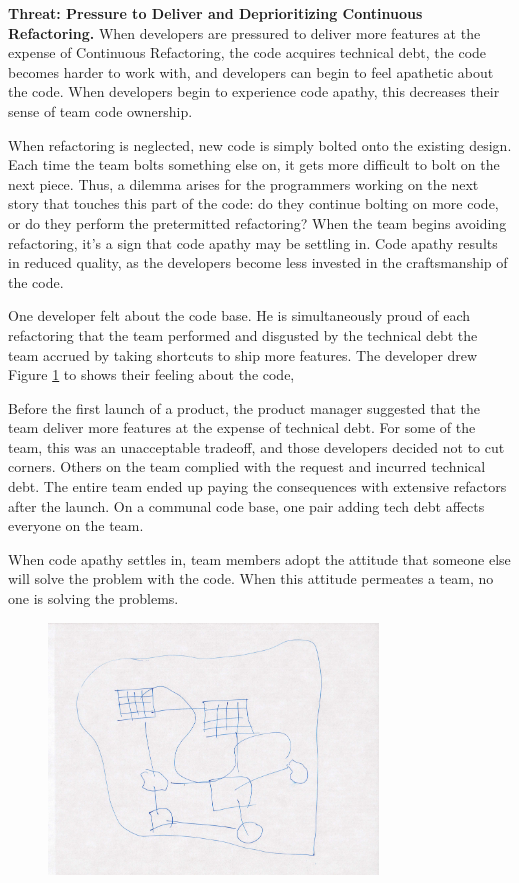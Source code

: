 \textbf{Threat: Pressure to Deliver and Deprioritizing Continuous Refactoring.} When developers are pressured to deliver more features at the expense of Continuous Refactoring, the code acquires technical debt, the code becomes harder to work with, and developers can begin to feel apathetic about the code. When developers begin to experience code apathy, this decreases their sense of team code ownership. 

When refactoring is neglected, new code is simply bolted onto the existing design. Each time the team bolts something else on, it gets more difficult to bolt on the next piece. Thus, a dilemma arises for the programmers working on the next story that touches this part of the code: do they continue bolting on more code, or do they perform the pretermitted refactoring? When the team begins avoiding refactoring, it's a sign that code apathy may be settling in. Code apathy results in reduced quality, as the developers become less invested in the craftsmanship of the code.

One developer felt  about the code base. He is simultaneously proud of each refactoring that the team performed and disgusted by the technical debt the team accrued by taking shortcuts to ship more features. The developer drew Figure \ref{Programmer1} to shows their feeling about the code, 

Before the first launch of a product, the product manager suggested that the team deliver more features at the expense of technical debt. For some of the team, this was an unacceptable tradeoff, and those developers decided not to cut corners. Others on the team complied with the request and incurred technical debt. The entire team ended up paying the consequences with extensive refactors after the launch. On a communal code base, one pair adding tech debt affects everyone on the team.

When code apathy settles in, team members adopt the attitude that someone else will solve the problem with the code. When this attitude permeates a team, no one is solving the problems. 

\begin{figure}[t]
\centering
\includegraphics[width=3.45in]{CodeOwnership.jpg}
\caption{}
\label{Programmer1}
\end{figure}


